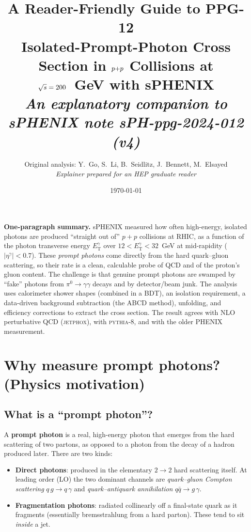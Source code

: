 \documentclass[11pt]{article}
\title{\textbf{A Reader-Friendly Guide to PPG-12}\\[4pt]
\large Isolated-Prompt-Photon Cross Section in $\pp$ Collisions at\\
$\sqrt{s} = 200$~GeV with sPHENIX\\[6pt]
\normalsize\itshape An explanatory companion to sPHENIX note sPH-ppg-2024-012 (v4)}
\author{\normalsize Original analysis: Y.\ Go, S.\ Li, B.\ Seidlitz, J.\ Bennett, M.\ Elsayed\\[2pt]
\normalsize\itshape Explainer prepared for an HEP graduate reader}
\date{\today}
\newlength{\calloutwd}
\newenvironment{nutshell}{%
  \par\vspace{6pt}\noindent
  \setlength{\fboxsep}{8pt}%
  \begingroup\color{black}%
  \fcolorbox{bggreenline}{boxgreen}\bgroup
  \begin{minipage}{\calloutwd}}
  {\end{minipage}\egroup\endgroup\par\vspace{6pt}}
\newcommand{\ETg}{E_{\mathrm{T}}^{\gamma}}
\newcommand{\pp}{p{+}p}
\begin{document}
\maketitle

\begin{nutshell}
\textbf{One-paragraph summary.} sPHENIX measured how often high-energy, isolated
photons are produced ``straight out of'' $\pp$ collisions at RHIC, as a function of the
photon transverse energy $\ETg$ over $12 < \ETg < 32$~GeV at mid-rapidity ($|\eta^\gamma|<0.7$).
These \emph{prompt photons} come directly from the hard quark--gluon scattering, so their rate
is a clean, calculable probe of QCD and of the proton's gluon content. The challenge is that
genuine prompt photons are swamped by ``fake'' photons from $\pi^0\!\to\!\gamma\gamma$ decays
and by detector/beam junk. The analysis uses calorimeter shower shapes (combined in a BDT),
an isolation requirement, a data-driven background subtraction (the ABCD method), unfolding,
and efficiency corrections to extract the cross section. The result agrees with NLO perturbative
QCD (\textsc{jetphox}), with \textsc{pythia}-8, and with the older PHENIX measurement.
\end{nutshell}

\tableofcontents

\section{Why measure prompt photons? (Physics motivation)}

\subsection{What is a ``prompt photon''?}

A \textbf{prompt photon} is a real, high-energy photon that emerges from the hard scattering of
two partons, as opposed to a photon from the decay of a hadron produced later. There are two
kinds:

\begin{itemize}[leftmargin=1.4em]
  \item \textbf{Direct photons}: produced in the elementary $2\to2$ hard scattering itself. At
  leading order (LO) the two dominant channels are
  \emph{quark--gluon Compton scattering} $q\,g \to q\,\gamma$ and
  \emph{quark--antiquark annihilation} $q\bar q \to g\,\gamma$.
  \item \textbf{Fragmentation photons}: radiated collinearly off a final-state quark as it
  fragments (essentially bremsstrahlung from a hard parton). These tend to sit \emph{inside}
  a jet.
\end{itemize}
\end{document}
